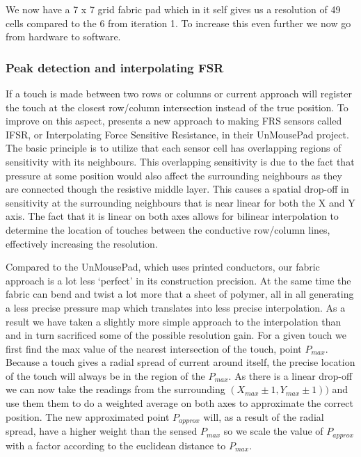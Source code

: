 We now have a 7 x 7 grid fabric pad which in it self gives us a resolution of 49 cells compared to the 6 from iteration 1.
To increase this even further we now go from hardware to software.

\subsubsection{Peak detection and interpolating FSR}
\label{ch:textiletouch:it2-ifsr}
If a touch is made between two rows or columns or current approach will register the touch at the closest row/column intersection instead of the true position.
To improve on this aspect, \citet{rosenberg2009unmousepad} presents a new approach to making FRS sensors called IFSR, or Interpolating Force Sensitive Resistance, in their UnMousePad project. The basic principle is to utilize that each sensor cell has overlapping regions of sensitivity with its neighbours.
This overlapping sensitivity is due to the fact that pressure at some position would also affect the surrounding neighbours as they are connected though the resistive middle layer.
This causes a spatial drop-off in sensitivity at the surrounding neighbours that is near linear for both the X and Y axis.
The fact that it is linear on both axes allows for bilinear interpolation to determine the location of touches between the conductive row/column lines, effectively increasing the resolution. 

Compared to the UnMousePad, which uses printed conductors, our fabric approach is a lot less `perfect' in its construction precision.
At the same time the fabric can bend and twist a lot more that a sheet of polymer, all in all generating a less precise pressure map which translates into less precise interpolation.
As a result we have taken a slightly more simple approach to the interpolation than \citep{rosenberg2009unmousepad} and in turn sacrificed some of the possible resolution gain.
\blank
For a given touch we first find the max value of the nearest intersection of the touch, point \(P_{max}\).
Because a touch gives a radial spread of current around itself, the precise location of the touch will always be in the region of the \(P_{max}\).
As there is a linear drop-off we can now take the readings from the surrounding \((X_{max}\pm1,Y_{max}\pm1))\) and use them them to do a weighted average on both axes to approximate the correct position.
The new approximated point \(P_{approx}\) will, as a result of the radial spread, have a higher weight than the sensed \(P_{max}\) so we scale the value of \(P_{approx}\) with a factor according to the euclidean distance to \(P_{max}\). 

